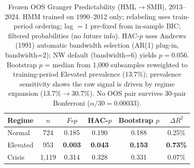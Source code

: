 \documentclass[sigconf,anonymous]{acmart}
\begin{document}
\begin{table}[t]
\centering
\setlength{\tabcolsep}{5pt}
\caption{Frozen OOS Granger Predictability (HML$\to$SMB), 2013--2024.
HMM trained on 1990--2012 only; relabeling uses train-period ordering;
lag $= 1$ pre-fixed from in-sample BIC; filtered probabilities (no future info).
HAC-$p$ uses Andrews (1991) automatic bandwidth selection (AR(1) plug-in, bandwidth=2);
NW default (bandwidth=6) yields $p = 0.056$.
Bootstrap $p$ = median from 1,000 subsamples reweighted to training-period
Elevated prevalence (13.7\%); prevalence sensitivity shows the raw signal
is driven by regime expansion (13.7\%$\to$30.7\%).
No OOS pair survives 30-pair Bonferroni ($\alpha/30 = 0.00033$).}
\label{tab:frozen_granger}
\small
\begin{tabular}{@{}lccccc@{}}
\toprule
Regime & $n$ & $F$-$p$ & HAC-$p$ & Bootstrap $p$ & $\Delta R^2$ \\
\midrule
Normal    & 724 & 0.185 & 0.190 & 0.188 & 0.25\% \\
Elevated  & 953 & \textbf{0.003} & \textbf{0.043} & \textbf{0.153} & \textbf{0.73\%} \\
Crisis    & 1,119 & 0.314 & 0.328 & 0.331 & 0.07\% \\
\bottomrule
\end{tabular}
\end{table}
\end{document}
